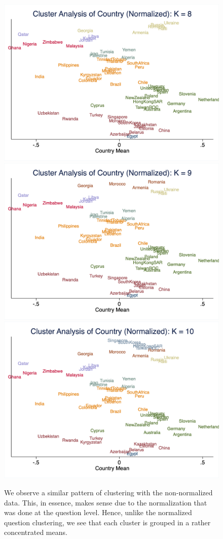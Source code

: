 \documentclass[10pt,leqno]{article}
\begin{document}
\begin{figure}  [h!]
\begin{center}
\includegraphics[scale=0.15]{CA_CountryK8_NOR.png}
\includegraphics[scale=0.15]{CA_CountryK9_NOR.png}
\includegraphics[scale=0.15]{CA_CountryK10_NOR.png}
\end{center}
We observe a similar pattern of clustering with the non-normalized data. This, in essence, makes sense due to the normalization that was done at the question level. Hence, unlike the normalized question clustering, we see that each cluster is grouped in a rather concentrated means. 
\end{figure}  
\end{document}
